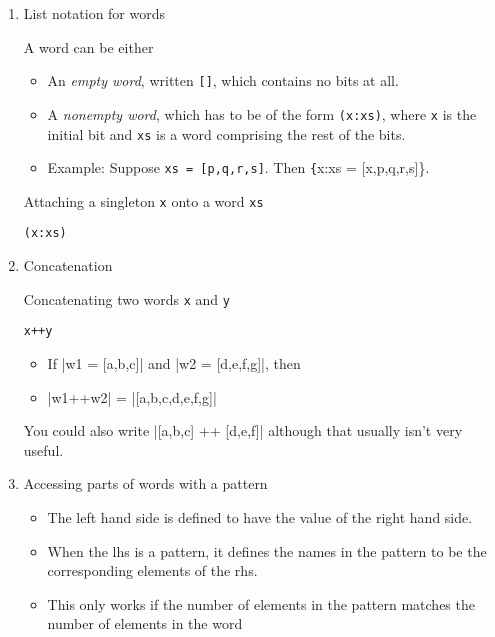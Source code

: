 \documentclass[11pt]{article}
\begin{document}
\begin{enumerate}
\item List notation for words
\label{sec:orgbc721c7}

A word can be either

\begin{itemize}
\item An \emph{empty word}, written \texttt{[]}, which contains no
bits at all.
\item A \emph{nonempty word}, which has to be of the form
\texttt{(x:xs)}, where \texttt{x} is the initial bit and
\texttt{xs} is a word comprising the rest of the bits.
\item Example: Suppose \texttt{xs = [p,q,r,s]}.  Then \texttt\{x:xs
= [x,p,q,r,s]\}.
\end{itemize}

Attaching a singleton \texttt{x} onto a word \texttt{xs}

\begin{verbatim}
(x:xs)
\end{verbatim}

\item Concatenation
\label{sec:orgf1d920f}

Concatenating two words \texttt{x} and \texttt{y}

\begin{verbatim}
x++y
\end{verbatim}

\begin{itemize}
\item If |w1 = [a,b,c]| and |w2 = [d,e,f,g]|, then
\item |w1++w2| = |[a,b,c,d,e,f,g]|
\end{itemize}

You could also write |[a,b,c] ++ [d,e,f]| although that usually isn't
very useful.

\item Accessing parts of words with a pattern
\label{sec:orgf2a9f4c}

\begin{itemize}
\item The left hand side is defined to have the value of the right
hand side.
\item When the lhs is a pattern, it defines the names in the pattern
to be the corresponding elements of the rhs.
\item This only works if the number of elements in the pattern matches
the number of elements in the word
\end{itemize}


\end{enumerate}
\end{document}
